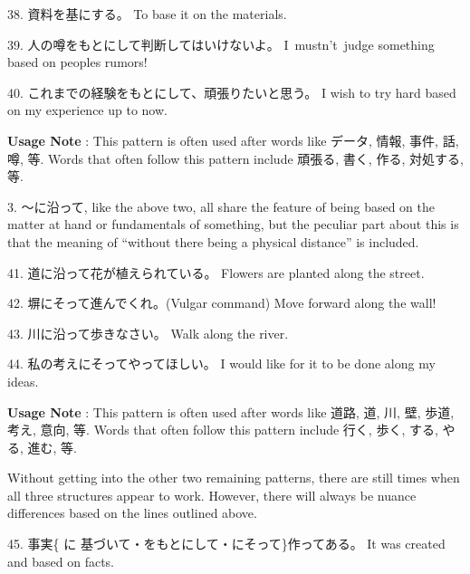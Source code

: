 \par{38. 資料を基にする。 \hfill\break
To base it on the materials. }
 
\par{39. 人の噂をもとにして判断してはいけないよ。 \hfill\break
I mustn't judge something based on people\textquotesingle s rumors! }
 
\par{40. これまでの経験をもとにして、頑張りたいと思う。 \hfill\break
I wish to try hard based on my experience up to now. }
 
\par{\textbf{Usage Note }: This pattern is often used after words like データ, 情報, 事件, 話, 噂, 等. Words that often follow this pattern include 頑張る, 書く, 作る, 対処する, 等. }
 
\par{3. ～に沿って, like the above two, all share the feature of being based on the matter at hand or fundamentals of something, but the peculiar part about this is that the meaning of “without there being a physical distance” is included. }
 
\par{41. 道に沿って花が植えられている。 \hfill\break
Flowers are planted along the street. }
 
\par{42. 塀にそって進んでくれ。(Vulgar command) \hfill\break
Move forward along the wall! }
 
\par{43. 川に沿って歩きなさい。 \hfill\break
Walk along the river. }
 
\par{44. 私の考えにそってやってほしい。 \hfill\break
I would like for it to be done along my ideas. }
 
\par{\textbf{Usage Note }: This pattern is often used after words like 道路, 道, 川, 壁, 歩道, 考え, 意向, 等. Words that often follow this pattern include 行く, 歩く, する, やる, 進む, 等. }
 
\par{Without getting into the other two remaining patterns, there are still times when all three structures appear to work. However, there will always be nuance differences based on the lines outlined above. }
 
\par{45. 事実\{ に 基づいて・をもとにして・にそって\}作ってある。 \hfill\break
It was created and based on facts. }
 
